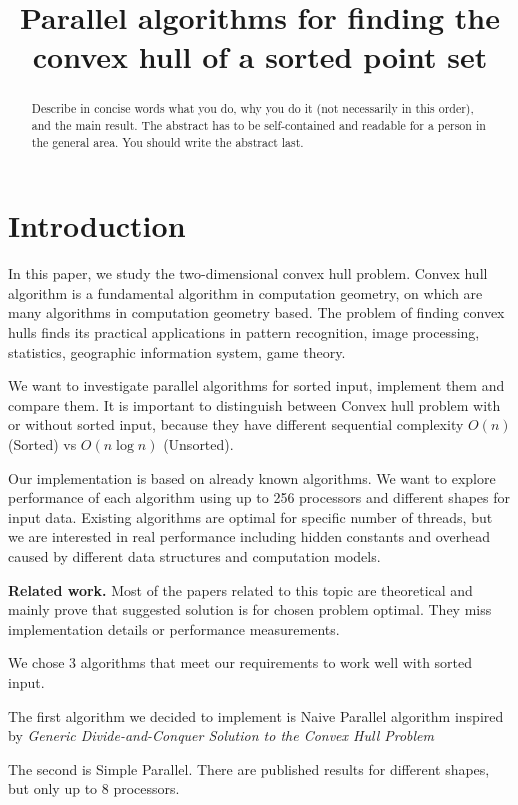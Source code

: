 \documentclass[letterpaper]{article}
\title{Parallel algorithms for finding the convex hull of a sorted point set}
\newcommand{\mypar}[1]{{\bf #1.}}
\theoremstyle{definition}
\begin{document}
%
\maketitle
%

\begin{abstract}
Describe in concise words what you do, why you do it (not necessarily
in this order), and the main result.  The abstract has to be
self-contained and readable for a person in the general area. You
should write the abstract last.
\end{abstract}

\section{Introduction}\label{sec:intro}


In this paper, we study the two-dimensional convex hull problem. Convex hull algorithm is a fundamental algorithm in computation geometry, on which are many algorithms in computation geometry based. The problem of finding convex hulls finds its practical applications in pattern recognition, image processing, statistics, geographic information system, game theory. 

We want to investigate parallel algorithms for sorted input, implement them and compare them. It is important to distinguish between Convex hull problem with or without sorted input, because they have different sequential complexity $O(n)$ (Sorted) vs $O(n\log n)$ (Unsorted). 

Our implementation is based on already known algorithms. We want to explore performance of each algorithm using up to 256 processors and different shapes for input data. Existing algorithms are optimal for specific number of threads, but we are interested in real performance including hidden constants and overhead caused by different data structures and computation models.

\mypar{Related work} Most of the papers related to this topic are theoretical and mainly prove that suggested solution is for chosen problem optimal. They miss implementation details or performance measurements.

We chose 3 algorithms that meet our requirements to work well with sorted input.

The first algorithm we decided to implement is Naive Parallel algorithm inspired by \textit{Generic Divide-and-Conquer Solution to the Convex Hull Problem} \cite{NaiveParallel} 

The second is Simple Parallel. \cite{SimpleParallel}  There are published results for different shapes, but only up to 8 processors.   
 
\end{document}

